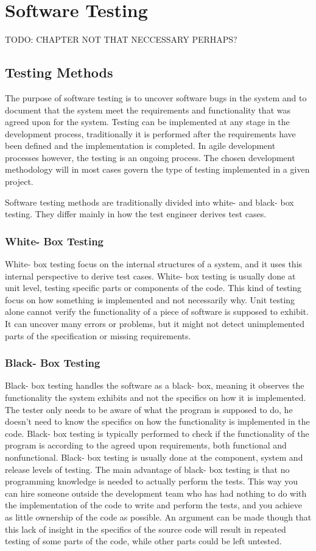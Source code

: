 \section{Software Testing}
TODO: CHAPTER NOT THAT NECCESSARY PERHAPS?

\subsection{Testing Methods}
The purpose of software testing is to uncover software bugs in the system and to document that the system meet the requirements and functionality that was agreed upon for the system. Testing can be implemented at any stage in the development process, traditionally it is performed after the requirements have been defined and the implementation is completed. In agile development processes however, the testing is an ongoing process. The chosen development methodology will in most cases govern the type of testing implemented in a given project.
\cite{sommerville2011software}

Software testing methods are traditionally divided into white- and black- box testing. They differ mainly in how the test engineer derives test cases.

\subsubsection{White- Box Testing}
White- box testing focus on the internal structures of a system, and it uses this internal perspective to derive test cases. White- box testing is usually done at unit level, testing specific parts or components of the code. This kind of testing focus on how something is implemented and not necessarily why. Unit testing alone cannot verify the functionality of a piece of software is supposed to exhibit. It can uncover many errors or problems, but it might not detect unimplemented parts of the specification or missing requirements.

\subsubsection{Black- Box Testing}
Black- box testing handles the software as a black- box, meaning it observes the functionality the system exhibits and not the specifics on how it is implemented. The tester only needs to be aware of what the program is supposed to do, he doesn't need to know the specifics on how the functionality is implemented in the code. Black- box testing is typically performed to check if the functionality of the program is according to the agreed upon requirements, both functional and nonfunctional. Black- box testing is usually done at the component, system and release levels of testing. The main advantage of black- box testing is that no programming knowledge is needed to actually perform the tests. This way you can hire someone outside the development team who has had nothing to do with the implementation of the code to write and perform the tests, and you achieve as little ownership of the code as possible. An argument can be made though that this lack of insight in the specifics of the source code will result in repeated testing of some parts of the code, while other parts could be left untested.

